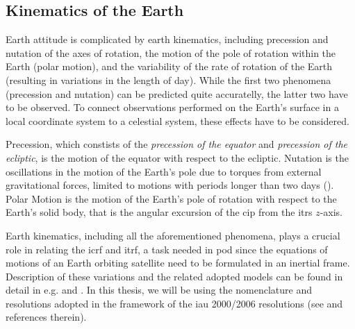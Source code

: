 \subsection{Kinematics of the Earth}\label{ssec:earth-attitude}

Earth attitude is complicated by earth kinematics, including precession and nutation 
of the axes of rotation, the motion of the pole of rotation within the Earth (polar 
motion), and the variability of the rate of rotation of the Earth (resulting in variations 
in the length of day). While the first two phenomena (precession and nutation) can be 
predicted quite accuratelly, the latter two have to be observed. To connect observations 
performed on the Earth's surface in a local coordinate system to a celestial system, 
these effects have to be considered.

Precession, which constists of the \emph{precession of the equator} and 
\emph{precession of the ecliptic}, is the motion of the equator with respect to 
the ecliptic. Nutation is the oscillations in the motion of the Earth's pole due 
to torques from external gravitational forces, limited to motions with periods longer 
than two days (\cite{Gurfil18}). Polar Motion is the motion of the Earth's pole of 
rotation with respect to the Earth's solid body, that is the angular excursion of 
the \gls{cip} from the \gls{itrs} $z$-axis.

Earth kinematics, including all the aforementioned phenomena, plays a crucial role in 
relating the \gls{icrf} and \gls{itrf}, a task needed in \gls{pod} since the equations 
of motions of an Earth orbiting satellite need to be formulated in an inertial frame.
Description of these variations and the related adopted models can be found in detail 
in e.g. \cite{Gurfil18} and \cite{Urban2013}. In this thesis, we will be using the 
nomenclature and resolutions adopted in the framework of the \gls{iau} 2000/2006 resolutions 
(see \cite{iers2010} and references therein).